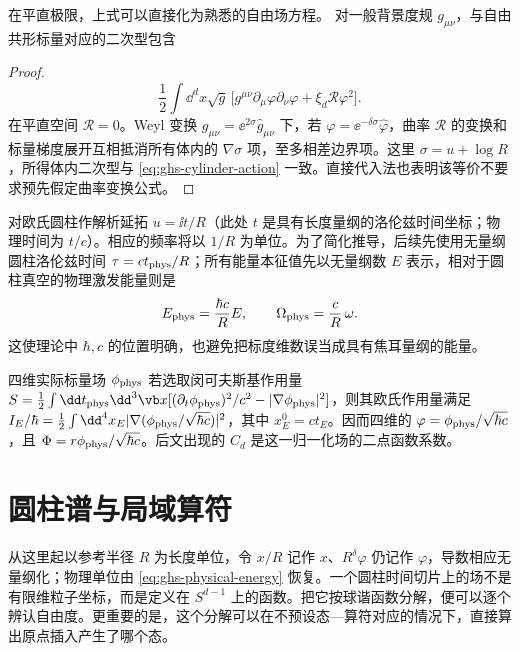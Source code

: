 在平直极限，上式可以直接化为熟悉的自由场方程。
对一般背景度规 $g_{\mu\nu}$，与自由共形标量对应的二次型包含
\begin{proof}
\begin{equation*}
\frac12\int\dd^d x\sqrt g\,\bigl[g^{\mu\nu}\partial_\mu\varphi\partial_\nu\varphi+\xi_d\mathcal R\varphi^2\bigr].
\end{equation*}
在平直空间 $\mathcal R=0$。Weyl 变换 $g_{\mu\nu}=\ee^{2\sigma}\widehat g_{\mu\nu}$ 下，若 $\varphi=\ee^{-\delta\sigma}\widehat\varphi$，曲率 $\mathcal R$ 的变换和标量梯度展开互相抵消所有体内的 $\nabla\sigma$ 项，至多相差边界项。这里 $\sigma=u+\log R$，所得体内二次型与 \cref{eq:ghs-cylinder-action} 一致。直接代入法也表明该等价不要求预先假定曲率变换公式。
\end{proof}

对欧氏圆柱作解析延拓 $u=\ii t/R$（此处 $t$ 是具有长度量纲的洛伦兹时间坐标；物理时间为 $t/c$）。相应的频率将以 $1/R$ 为单位。为了简化推导，后续先使用无量纲圆柱洛伦兹时间 $\tau=ct_{\rm phys}/R$；所有能量本征值先以无量纲数 $E$ 表示，相对于圆柱真空的物理激发能量则是
\begin{equation}\label{eq:ghs-physical-energy}
 E_{\rm phys}=\frac{\hbar c}{R}E,
 \qquad \Omega_{\rm phys}=\frac cR\,\omega.
\end{equation}
这使理论中 $\hbar,c$ 的位置明确，也避免把标度维数误当成具有焦耳量纲的能量。

四维实际标量场 $\phi_{\rm phys}$ 若选取闵可夫斯基作用量 $S=\frac12\int\dd t_{\rm phys}\dd^3\vb x[(\partial_t\phi_{\rm phys})^2/c^2-|\nabla\phi_{\rm phys}|^2]$，则其欧氏作用量满足 $I_E/\hbar=\frac12\int\dd^4x_E|\nabla(\phi_{\rm phys}/\sqrt{\hbar c})|^2$，其中 $x_E^0=ct_E$。因而四维的 $\varphi=\phi_{\rm phys}/\sqrt{\hbar c}$，且 $\Phi=r\phi_{\rm phys}/\sqrt{\hbar c}$。后文出现的 $C_d$ 是这一归一化场的二点函数系数。


\section{圆柱谱与局域算符}
\label{sec:ghs-cylinder-spectrum}


从这里起以参考半径 $R$ 为长度单位，令 $x/R$ 记作 $x$、$R^\delta\varphi$ 仍记作 $\varphi$，导数相应无量纲化；物理单位由 \cref{eq:ghs-physical-energy} 恢复。一个圆柱时间切片上的场不是有限维粒子坐标，而是定义在 $S^{d-1}$ 上的函数。把它按球谐函数分解，便可以逐个辨认自由度。更重要的是，这个分解可以在不预设态—算符对应的情况下，直接算出原点插入产生了哪个态。


